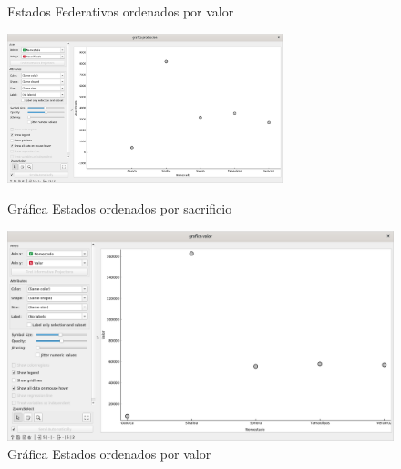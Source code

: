 \begin{enumerate}[1.]
\begin{enumerate}[Obj{e}t{i}vo 1.]
\begin{figure}
                \caption{Estados Federativos ordenados por valor}
                \label{tablevalor}
            \end{figure}
            \newpage
            
            
            \begin{figure}[htb!]
                \begin{minipage}[b]{0.5\linewidth} %
                \centering
                \includegraphics[width = 8cm]{imagenes/graficaestados-sacrificados.png}
                \caption{Gráfica Estados ordenados por sacrificio}
                \label{graficaestadossacrificio}
                \end{minipage}
                \hspace{0.5cm} %
            \begin{minipage}[b]{0.5\linewidth}
                \centering
                \includegraphics[width = 8 cm ]{imagenes/graficaestados-valor.png}
                \caption{Gráfica Estados ordenados por valor}
                \label{graficaestadosvalor}
                \end{minipage}
            \end{figure}
\newpage
            \newpage
            
            
            
        \end{enumerate}


\end{enumerate}